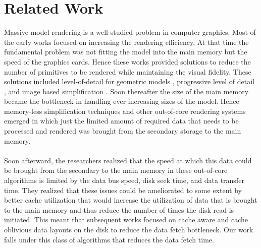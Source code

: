 \documentclass[conference]{acmsiggraph}
\begin{document}
\section{Related Work}

Massive model rendering is a well studied problem in computer graphics. Most of the early works focused on increasing the rendering efficiency. At that time the fundamental problem was not fitting the model into the main memory but the speed of the graphics cards. Hence these works provided solutions to reduce the number of primitives to be rendered while maintaining the visual fidelity. These solutions included level-of-detail for geometric models \cite{Luebke}, progressive level of detail \cite{Hoppe,Garland}, and image based simplification \cite{Aliaga,Hansong,Zhang}. Soon thereafter the size of the main memory became the bottleneck in handling ever increasing sizes of the model. Hence memory-less simplification techniques \cite{Lindstrom}  and other out-of-core rendering systems \cite{Correa,Varadhan} emerged in which just the limited amount of required data that needs to be processed and rendered was brought from the secondary storage to the main memory. \\
\\
Soon afterward, the researchers realized that the speed at which this data could be brought from the secondary to the main memory in these out-of-core algorithms is limited by the data bus speed, disk seek time, and data transfer time. They realized that these issues could be ameliorated to some extent by better cache utilization that would increase the utilization of data that is brought to the main memory and thus reduce the number of times the disk read is initiated. This meant that subsequent works focused on cache aware \cite{ssdpaper} and cache oblivious data layouts \cite{Yoon, other lindstrom's works} on the disk to reduce the  data fetch bottleneck. Our work falls under this class of algorithms that reduces the data fetch time. \\
\\
\end{document}
